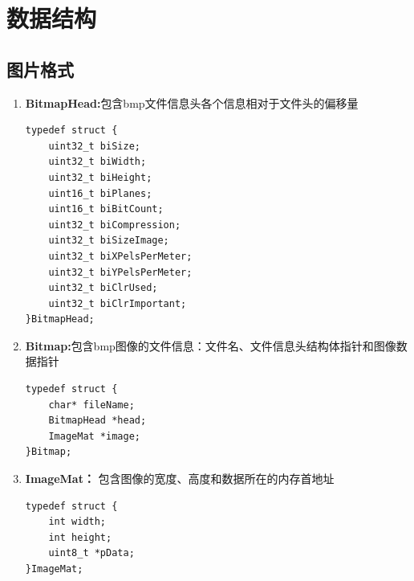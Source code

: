 \documentclass[12pt, a4paper, oneside]{ctexbook}
\begin{document}
	\section{数据结构}
		\subsection{图片格式}
		\begin{enumerate}
			\item \textbf{BitmapHead:}包含bmp文件信息头各个信息相对于文件头的偏移量
			\begin{lstlisting}
typedef struct {
	uint32_t biSize;
	uint32_t biWidth;
	uint32_t biHeight;
	uint16_t biPlanes;
	uint16_t biBitCount;
	uint32_t biCompression;
	uint32_t biSizeImage;
	uint32_t biXPelsPerMeter;
	uint32_t biYPelsPerMeter;
	uint32_t biClrUsed;
	uint32_t biClrImportant;
}BitmapHead;
			\end{lstlisting}
			
			
			\item \textbf{Bitmap:}包含bmp图像的文件信息：文件名、文件信息头结构体指针和图像数据指针
			\begin{lstlisting}
typedef struct {
	char* fileName;
	BitmapHead *head;
	ImageMat *image;
}Bitmap;
			\end{lstlisting}
			
			
			\item \textbf{ImageMat：} 包含图像的宽度、高度和数据所在的内存首地址
			\begin{lstlisting}[numbers=none]
typedef struct {
	int width;
	int height;
	uint8_t *pData;
}ImageMat;		
			\end{lstlisting}			
		\end{enumerate}
		
\end{document}
